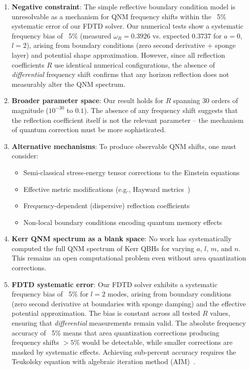 \documentclass[10pt,amsmath,amssymb,amsfonts]{article}
\begin{document}
\begin{enumerate}
\item \textbf{Negative constraint}: The simple reflective boundary condition model is unresolvable as a mechanism for QNM frequency shifts within the ~5\% systematic error of our FDTD solver. Our numerical tests show a systematic frequency bias of ~5\% (measured $\omega_R = 0.3926$ vs. expected $0.3737$ for $a=0$, $l=2$), arising from boundary conditions (zero second derivative + sponge layer) and potential shape approximation. However, since all reflection coefficients $R$ use identical numerical configurations, the absence of \textit{differential} frequency shift confirms that any horizon reflection does not measurably alter the QNM spectrum.

\item \textbf{Broader parameter space}: Our result holds for $R$ spanning 30 orders of magnitude ($10^{-30}$ to $0.1$). The absence of any frequency shift suggests that the reflection coefficient itself is not the relevant parameter -- the mechanism of quantum correction must be more sophisticated.

\item \textbf{Alternative mechanisms}: To produce observable QNM shifts, one must consider:
\begin{itemize}
\item Semi-classical stress-energy tensor corrections to the Einstein equations
\item Effective metric modifications (e.g., Hayward metrics~\cite{hayward2006})
\item Frequency-dependent (dispersive) reflection coefficients
\item Non-local boundary conditions encoding quantum memory effects
\end{itemize}

\item \textbf{Kerr QNM spectrum as a blank space}: No work has systematically computed the full QNM spectrum of Kerr QBHs for varying $a$, $l$, $m$, and $n$. This remains an open computational problem even without area quantization corrections.

\item \textbf{FDTD systematic error}: Our FDTD solver exhibits a systematic frequency bias of ~5\% for $l=2$ modes, arising from boundary conditions (zero second derivative at boundaries with sponge damping) and the effective potential approximation. The bias is constant across all tested $R$ values, ensuring that \textit{differential} measurements remain valid. The absolute frequency accuracy of ~5\% means that area quantization corrections producing frequency shifts $> 5\%$ would be detectable, while smaller corrections are masked by systematic effects. Achieving sub-percent accuracy requires the Teukolsky equation with algebraic iteration method (AIM)~\cite{berti2009}.
\end{enumerate}
\end{document}

